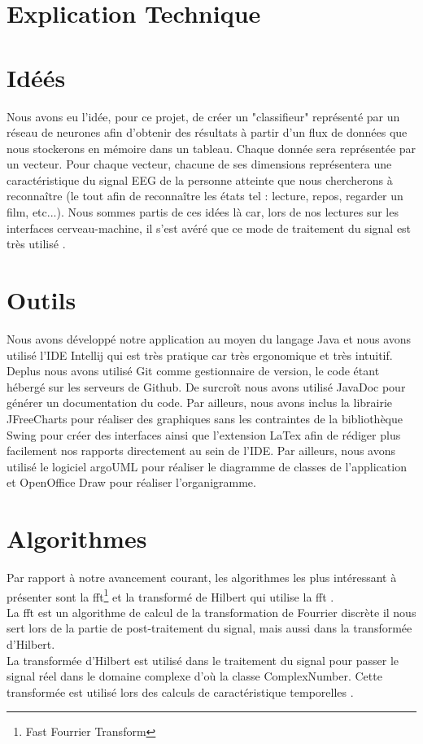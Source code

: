 
	\section{Explication Technique} %
	\label{sec:explication_technique}
		
		\section{Idéés} %
		\label{sec:idees}

		
		Nous avons eu l'idée, pour ce projet, de créer un "classifieur" représenté par un réseau de neurones afin d'obtenir des résultats à partir d'un flux de données que nous stockerons en mémoire dans un tableau. Chaque donnée sera représentée par un vecteur. Pour chaque vecteur, chacune de ses dimensions représentera une caractéristique du signal EEG de la personne atteinte que nous chercherons à reconnaître (le tout afin de reconnaître les états tel : lecture, repos, regarder un film, etc...). Nous sommes partis de ces idées là car, lors de nos lectures sur les interfaces cerveau-machine, il s'est avéré que ce mode de traitement du signal est très utilisé .
		
		\section{Outils} %
		\label{sec:outils}
		
		Nous avons développé notre application au moyen du langage Java et nous avons utilisé l'IDE Intellij qui est très pratique car très ergonomique et très intuitif. 
		Deplus nous avons utilisé Git comme gestionnaire de version, le code étant hébergé sur les serveurs de Github. De surcroît nous avons utilisé JavaDoc pour générer un documentation du code.
		Par ailleurs, nous avons inclus la librairie JFreeCharts pour réaliser des graphiques sans les contraintes de la bibliothèque Swing pour créer des interfaces ainsi que l'extension LaTex afin de rédiger plus facilement nos rapports directement au sein de l'IDE.
		Par ailleurs, nous avons utilisé le logiciel argoUML pour réaliser le diagramme de classes de l'application et OpenOffice Draw pour réaliser l'organigramme.
		
		\section{Algorithmes} %
		\label{sec:algorithmes}
		 Par rapport à notre avancement courant, les algorithmes les plus intéressant à présenter sont la fft\footnote{Fast Fourrier Transform} et la transformé de Hilbert qui utilise la fft . \\ 
		 La fft est un algorithme de calcul de la transformation de Fourrier discrète il nous sert lors de la partie de post-traitement du signal, mais aussi dans la transformée d'Hilbert.\\
		 La transformée d'Hilbert est utilisé dans le traitement du signal pour passer le signal réel dans le domaine complexe d’où la classe ComplexNumber. Cette transformée est utilisé lors des calculs de caractéristique temporelles .

